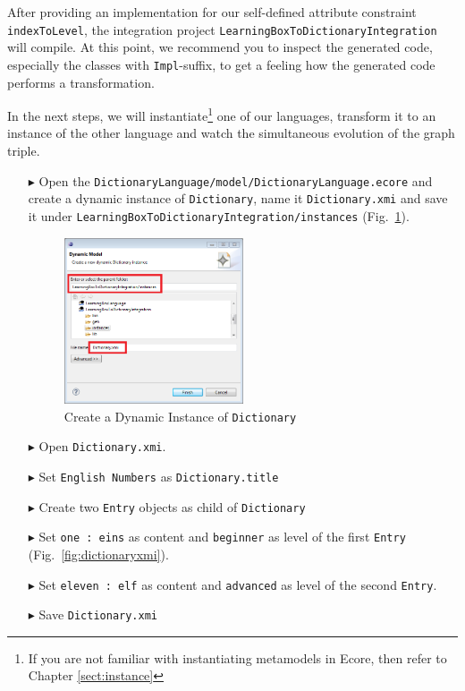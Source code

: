 After providing an implementation for our self-defined attribute constraint \texttt{indexToLevel}, the integration project \texttt{LearningBox\-To\-Dictionary\-Integ\-ration} will compile. 
At this point, we recommend you to inspect the generated code, especially the classes with \texttt{Impl}-suffix, to get a feeling how the generated code performs a transformation.

In the next steps, we will instantiate\footnote{If you are not familiar with instantiating metamodels in Ecore, then refer to Chapter \ref{sect:instance}} one of our languages, transform it to an instance of the other language and watch the simultaneous evolution of the graph triple.

\begin{enumerate}
\item[$\blacktriangleright$] Open the \texttt{Dictionary\-Language/model/Dictionary\-Language.ecore} and create a dynamic instance of \texttt{Dictionary}, name it \texttt{Dictionary.xmi} and save it under \texttt{Learning\-Box\-To\-Dictionary\-Integration/instances} (Fig.~\ref{fig:create_instance_dict}).

\begin{figure}[htbp]
\begin{center}
  \includegraphics[width=0.5\textwidth]{pics/tggBilder/transformation/tgg24}
  \caption{Create a Dynamic Instance of \texttt{Dictionary}}  
  \label{fig:create_instance_dict}
\end{center}
\end{figure} 

\item[$\blacktriangleright$] Open \texttt{Dictionary.xmi}.
\item[$\blacktriangleright$] Set \texttt{English Numbers} as \texttt{Dictionary.title}
\item[$\blacktriangleright$] Create two \texttt{Entry} objects as child of \texttt{Dictionary}
\item[$\blacktriangleright$] Set \texttt{one : eins} as content and \texttt{beginner} as level of the first \texttt{Entry} (Fig.~\ref{fig:dictionaryxmi}).
\item[$\blacktriangleright$] Set \texttt{eleven : elf} as content and \texttt{advanced} as level of the second \texttt{Entry}.
\item[$\blacktriangleright$] Save \texttt{Dictionary.xmi}


\end{enumerate}
